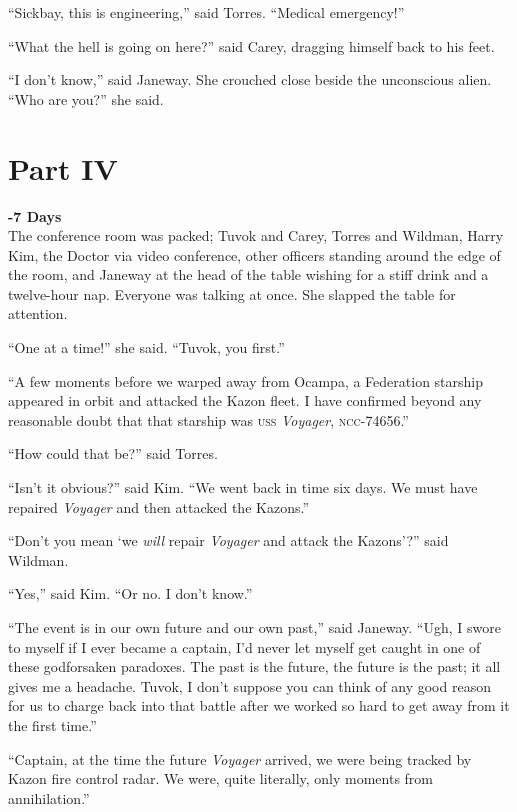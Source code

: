 \documentclass[twoside,letterpaper,12pt]{memoir}
\begin{document}
``Sickbay, this is engineering,'' said Torres. ``Medical emergency!''

``What the hell is going on here?'' said Carey, dragging himself back to his feet.

``I don't know,'' said Janeway. She crouched close beside the unconscious alien. ``Who are you?'' she said.

\chapter*{Part IV}

\noindent\textbf{-7 Days}\\

The conference room was packed; Tuvok and Carey, Torres and Wildman, Harry Kim, the Doctor via video conference, other officers standing around the edge of the room, and Janeway at the head of the table wishing for a stiff drink and a twelve-hour nap. Everyone was talking at once. She slapped the table for attention. 

``One at a time!'' she said. ``Tuvok, you first.'' 

``A few moments before we warped away from Ocampa, a Federation starship appeared in orbit and attacked the Kazon fleet. I have confirmed beyond any reasonable doubt that that starship was \textsc{uss} \textit{Voyager}, \textsc{ncc}-74656.'' 

``How could that be?'' said Torres. 

``Isn't it obvious?'' said Kim. ``We went back in time six days. We must have repaired \textit{Voyager} and then attacked the Kazons.'' 

``Don't you mean `we \textit{will} repair \textit{Voyager} and attack the Kazons'?'' said Wildman. 

``Yes,'' said Kim. ``Or no. I don't know.'' 

``The event is in our own future and our own past,'' said Janeway. ``Ugh, I swore to myself if I ever became a captain, I'd never let myself get caught in one of these godforsaken paradoxes. The past is the future, the future is the past; it all gives me a headache. Tuvok, I don't suppose you can think of any good reason for us to charge back into that battle after we worked so hard to get away from it the first time.'' 

``Captain, at the time the future \textit{Voyager} arrived, we were being tracked by Kazon fire control radar. We were, quite literally, only moments from annihilation.'' 
\end{document}
